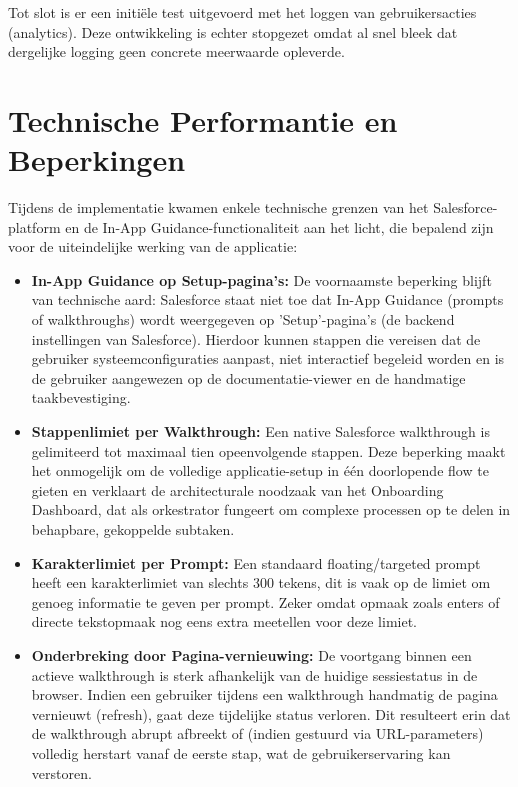 Tot slot is er een initiële test uitgevoerd met het loggen van gebruikersacties (analytics). Deze ontwikkeling is echter stopgezet omdat al snel bleek dat dergelijke logging geen concrete meerwaarde opleverde.

\section{Technische Performantie en Beperkingen}
Tijdens de implementatie kwamen enkele technische grenzen van het Salesforce-platform en de In-App Guidance-functionaliteit aan het licht, die bepalend zijn voor de uiteindelijke werking van de applicatie:

\begin{itemize}
	\item \textbf{In-App Guidance op Setup-pagina's:} De voornaamste beperking blijft van technische aard: Salesforce staat niet toe dat In-App Guidance (prompts of walkthroughs) wordt weergegeven op 'Setup'-pagina's (de backend instellingen van Salesforce). Hierdoor kunnen stappen die vereisen dat de gebruiker systeemconfiguraties aanpast, niet interactief begeleid worden en is de gebruiker aangewezen op de documentatie-viewer en de handmatige taakbevestiging.
	
	\item \textbf{Stappenlimiet per Walkthrough:} Een native Salesforce walkthrough is gelimiteerd tot maximaal tien opeenvolgende stappen. Deze beperking maakt het onmogelijk om de volledige applicatie-setup in één doorlopende flow te gieten en verklaart de architecturale noodzaak van het Onboarding Dashboard, dat als orkestrator fungeert om complexe processen op te delen in behapbare, gekoppelde subtaken.
	
	\item \textbf{Karakterlimiet per Prompt:} Een standaard floating/targeted prompt heeft een karakterlimiet van slechts 300 tekens, dit is vaak op de limiet om genoeg informatie te geven per prompt. Zeker omdat opmaak zoals enters of directe tekstopmaak nog eens extra meetellen voor deze limiet.
	
	\item \textbf{Onderbreking door Pagina-vernieuwing:} De voortgang binnen een actieve walkthrough is sterk afhankelijk van de huidige sessiestatus in de browser. Indien een gebruiker tijdens een walkthrough handmatig de pagina vernieuwt (refresh), gaat deze tijdelijke status verloren. Dit resulteert erin dat de walkthrough abrupt afbreekt of (indien gestuurd via URL-parameters) volledig herstart vanaf de eerste stap, wat de gebruikerservaring kan verstoren.
	

\end{itemize}
